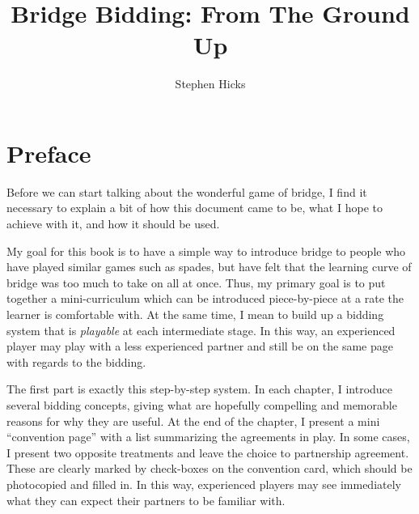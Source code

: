\documentclass[oneside]{memoir}
\begin{document}
\traceoff

\title{Bridge Bidding: From The Ground Up}
\author{Stephen Hicks}

\maketitle

\vspace*{-1.5pc}
\tableofcontents*

\chapter*{Preface}
Before we can start talking about the wonderful game of bridge, I find it
necessary to explain a bit of how this document came to be, what I hope to
achieve with it, and how it should be used.

My goal for this book is to have a simple way to introduce bridge to people
who have played similar games such as spades, but have felt that the learning
curve of bridge was too much to take on all at once.  Thus, my primary goal
is to put together a mini-curriculum which can be introduced piece-by-piece
at a rate the learner is comfortable with.  At the same time, I mean to
build up a bidding system that is \textit{playable} at each intermediate stage.
In this way, an experienced player may play with a less experienced partner
and still be on the same page with regards to the bidding.

The first part is exactly this step-by-step system.  In each chapter,
I introduce several bidding concepts, giving what are hopefully compelling
and memorable reasons for why they are useful.  At the end of the chapter, I
present a mini ``convention page'' with a list summarizing the agreements
in play.  In some cases, I present two opposite treatments and leave the
choice to partnership agreement.  These are clearly marked by check-boxes
on the convention card, which should be photocopied and filled in.  In this
way, experienced players may see immediately what they can expect their
partners to be familiar with.  
\end{document}
